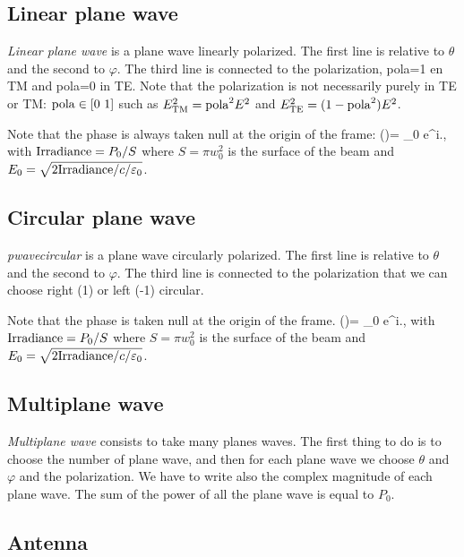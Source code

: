 \subsection{Linear plane wave }

{\it Linear plane wave} is a plane wave linearly polarized. The first line
is relative to $\theta$ and the second to $\varphi$. The third line is
connected to the polarization, pola=1 en TM and pola=0 in TE.  Note
that the polarization is not necessarily purely in TE or TM:
${\rm pola}\in[0~1]$ such as $E^2_{\rm TM}={\rm pola}^2E^2$ and
$E^2_{\rm TE}=(1-{\rm pola}^2)E^2$.

Note that the phase is always taken null at the origin of the frame:
\be {}()= _0 e^{i.}, \ee
with ${\rm Irradiance}=P_0/S$ where $S=\pi w_0^2$ is the surface of
the beam and $E_0=\sqrt{2 {\rm Irradiance}/c/\varepsilon_0}$.


\subsection{Circular plane wave }

{\it pwavecircular } is a plane wave circularly polarized. The first
line is relative to $\theta$ and the second to $\varphi$. The third
line is connected to the polarization that we can choose right (1) or
left (-1) circular.

Note that the phase is taken null at the origin of the frame.
\be {}()= _0 e^{i.}, \ee
with ${\rm Irradiance}=P_0/S$ where $S=\pi w_0^2$ is the surface of
the beam and $E_0=\sqrt{2 {\rm Irradiance}/c/\varepsilon_0}$.


\subsection{Multiplane wave}

{\it Multiplane wave} consists to take many planes waves. The first
thing to do is to choose the number of plane wave, and then for each
plane wave we choose $\theta$ and $\varphi$ and the polarization. We
have to write also the complex magnitude of each plane wave. The sum
of the power of all the plane wave is equal to $P_0$.


\subsection{Antenna}

